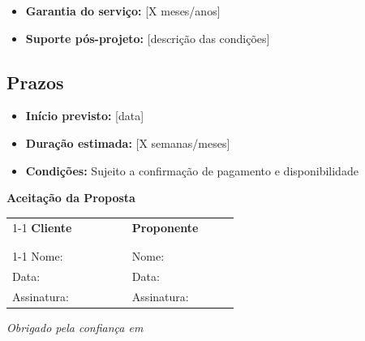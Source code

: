 \begin{itemize}
    \item \textbf{Garantia do serviço:} [X meses/anos]
    \item \textbf{Suporte pós-projeto:} [descrição das condições]
\end{itemize}

\vskip 0.8cm

\subsection{Prazos}

\begin{itemize}
    \item \textbf{Início previsto:} [data]
    \item \textbf{Duração estimada:} [X semanas/meses]
    \item \textbf{Condições:} Sujeito a confirmação de pagamento e disponibilidade
\end{itemize}

\vskip 1.5cm

\begin{center}
    \color{prop-primary}\Large\bfseries Aceitação da Proposta
\end{center}

\vskip 1cm

\begin{table}[H]
    \centering
    \begin{tabular}{
        p{0.42\linewidth}p{0.05\linewidth}p{0.42\linewidth}
    }
        \cline{1-1}\cline{3-3}
        \textbf{\color{prop-primary}Cliente} & & \textbf{\color{prop-primary}Proponente} \\[1.5em]
        & & \\
        & & \\
        \cline{1-1}\cline{3-3}
        \small\color{prop-muted}Nome: \underline{\hspace{4cm}} & & \small\color{prop-muted}Nome: \underline{\hspace{4cm}} \\[0.8em]
        \small\color{prop-muted}Data: \underline{\hspace{4cm}} & & \small\color{prop-muted}Data: \underline{\hspace{4cm}} \\[0.8em]
        \small\color{prop-muted}Assinatura: \underline{\hspace{4cm}} & & \small\color{prop-muted}Assinatura: \underline{\hspace{4cm}} \\
    \end{tabular}
\end{table}

\vskip 1.5cm

\begin{center}
    \small\color{prop-muted}
    \textit{Obrigado pela confiança em \proponentname}
\end{center}
